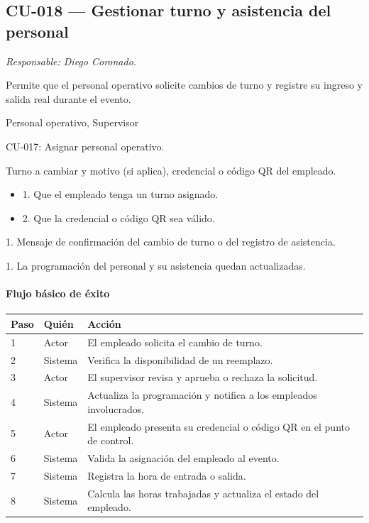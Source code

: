 \subsection{CU-018 --- Gestionar turno y asistencia del personal}
\label{cu:cu-018}
\textit{Responsable: Diego Coronado.}

\begin{description}[leftmargin=!, labelwidth=3.4cm, style=nextline, topsep=3pt]
\item[Objetivo] Permite que el personal operativo solicite cambios de turno y registre su ingreso y salida real durante el evento.

\item[Actores] Personal operativo, Supervisor

\item[CU relacionados] CU-017: Asignar personal operativo.

\item[Entradas] Turno a cambiar y motivo (si aplica), credencial o código QR del empleado.

\item[Pre-condiciones] \hfill
\begin{itemize}[leftmargin=1.2em, topsep=1pt]
  \item 1. Que el empleado tenga un turno asignado.
  \item 2. Que la credencial o código QR sea válido.
\end{itemize}

\item[Salidas] 1. Mensaje de confirmación del cambio de turno o del registro de asistencia.

\item[Post-condiciones] 1. La programación del personal y su asistencia quedan actualizadas.

\end{description}

\paragraph{Flujo básico de éxito}
\begin{longtable}{P{1.1cm}P{1.8cm}P{10.5cm}}
\toprule
\textbf{Paso} & \textbf{Quién} & \textbf{Acción}\\
\midrule
{} & Actor & El empleado solicita el cambio de turno.\\
2 & Sistema & Verifica la disponibilidad de un reemplazo.\\
3 & Actor & El supervisor revisa y aprueba o rechaza la solicitud.\\
4 & Sistema & Actualiza la programación y notifica a los empleados involucrados.\\
5 & Actor & El empleado presenta su credencial o código QR en el punto de control.\\
6 & Sistema & Valida la asignación del empleado al evento.\\
7 & Sistema & Registra la hora de entrada o salida.\\
8 & Sistema & Calcula las horas trabajadas y actualiza el estado del empleado.\\
\bottomrule
\end{longtable}

